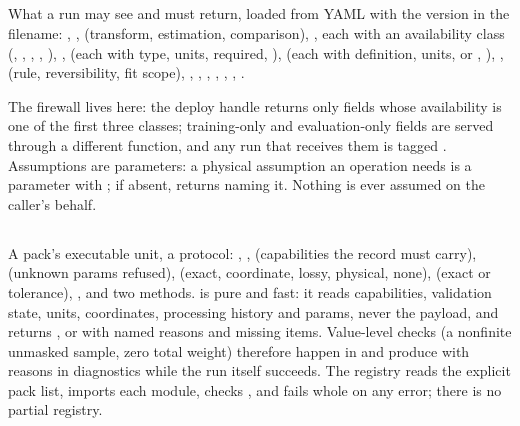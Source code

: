 \documentclass[11pt,a4paper]{article}
\begin{document}
\subsection{}
\begin{sloppypar}
What a run may see and must return, loaded from YAML with the version in the filename: , ,  (transform, estimation, comparison), ,  each with an availability class (, , , , ), ,  (each with type, units, required, ),  (each with definition, units,  or , ), ,  (rule, reversibility, fit scope), , , , , , , .

\end{sloppypar}
The firewall lives here: the deploy handle returns only fields whose availability is one of the first three classes; training-only and evaluation-only fields are served through a different function, and any run that receives them is tagged . Assumptions are parameters: a physical assumption an operation needs is a parameter with ; if absent,  returns  naming it. Nothing is ever assumed on the caller's behalf.

\subsection{}
\begin{sloppypar}
A pack's executable unit, a protocol: , ,  (capabilities the record must carry),  (unknown params refused),  (exact, coordinate, lossy, physical, none),  (exact or tolerance), , and two methods.  is pure and fast: it reads capabilities, validation state, units, coordinates, processing history and params, never the payload, and returns ,  or  with named reasons and missing items. Value-level checks (a nonfinite unmasked sample, zero total weight) therefore happen in  and produce  with reasons in diagnostics while the run itself succeeds. The registry reads the explicit pack list, imports each module, checks , and fails whole on any error; there is no partial registry.

\end{sloppypar}
\end{document}
